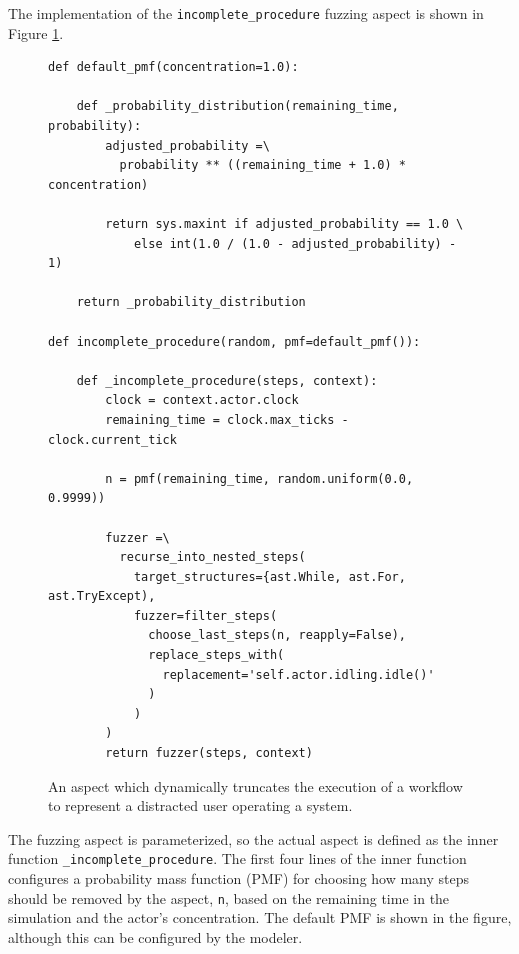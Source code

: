 \documentclass{llncs}
\begin{document}
The implementation of the \lstinline!incomplete_procedure! fuzzing aspect is shown in Figure
\ref{fig:distraction-fuzzer}.%
\begin{figure}[t]
  \centering
\begin{lstlisting}
def default_pmf(concentration=1.0):

    def _probability_distribution(remaining_time, probability):
        adjusted_probability =\
          probability ** ((remaining_time + 1.0) * concentration)

        return sys.maxint if adjusted_probability == 1.0 \
            else int(1.0 / (1.0 - adjusted_probability) - 1)

    return _probability_distribution

def incomplete_procedure(random, pmf=default_pmf()):

    def _incomplete_procedure(steps, context):
        clock = context.actor.clock
        remaining_time = clock.max_ticks - clock.current_tick

        n = pmf(remaining_time, random.uniform(0.0, 0.9999))

        fuzzer =\
          recurse_into_nested_steps(
            target_structures={ast.While, ast.For, ast.TryExcept),
            fuzzer=filter_steps(
              choose_last_steps(n, reapply=False),
              replace_steps_with(
                replacement='self.actor.idling.idle()'
              )
            )
        )
        return fuzzer(steps, context)
\end{lstlisting}
  \caption{An aspect which dynamically truncates the execution of a workflow to represent a distracted user operating a
    system.}
  \label{fig:distraction-fuzzer}
\end{figure}
The fuzzing aspect is parameterized, so the actual aspect is defined as the inner
function \lstinline!_incomplete_procedure!.  The first four lines of the inner function configures a probability mass
function (PMF) for choosing how many steps should be removed by the aspect, \lstinline!n!, based on the remaining time
in the simulation and the actor's concentration. The default PMF is shown in the figure, although this can be configured
by the modeler.
\end{document}
